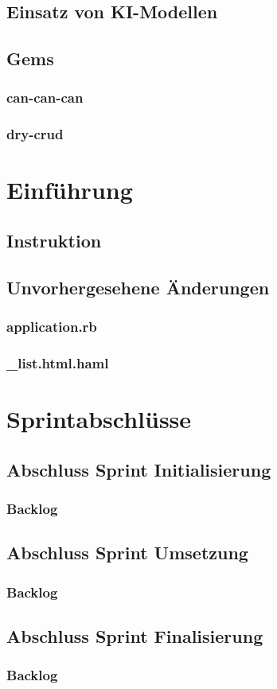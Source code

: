 \section{Einsatz von KI-Modellen}
\section{Gems}
\subsection{can-can-can}
\subsection{dry-crud}

\chapter{Einführung}

\section{Instruktion}

\section{Unvorhergesehene Änderungen}
\subsection{application.rb}
\subsection{\_list.html.haml}

\chapter{Sprintabschlüsse}

\section{Abschluss Sprint Initialisierung}
\subsection{Backlog}

\section{Abschluss Sprint Umsetzung}
\subsection{Backlog}

\section{Abschluss Sprint Finalisierung}
\subsection{Backlog}



